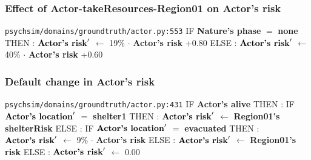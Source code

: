 \documentclass{article}%
\begin{document}
\subsubsection{Effect of Actor{-}takeResources{-}Region01 on Actor's risk}%
\label{ssubsec:Effect of Actor{-}takeResources{-}Region01 on Actor's risk}%
\begin{flushleft}%
\verb|psychsim/domains/groundtruth/actor.py:553|%
\linebreak%
IF %
\textbf{Nature's phase}%
$=$%
\textbf{none}%
\linebreak%
\hspace*{2em}%
THEN %
: %
$\mbox{\textbf{Actor's risk}} '$%
$\leftarrow$%
19\%%
$\cdot$%
\textbf{Actor's risk}%
+0.80%
\linebreak%
\hspace*{2em}%
ELSE %
: %
$\mbox{\textbf{Actor's risk}} '$%
$\leftarrow$%
40\%%
$\cdot$%
\textbf{Actor's risk}%
+0.60%
\end{flushleft}

%
\subsubsection{Default change in Actor's risk}%
\label{ssubsec:Default change in Actor's risk}%
\begin{flushleft}%
\verb|psychsim/domains/groundtruth/actor.py:431|%
\linebreak%
IF %
\textbf{Actor's alive}%
\linebreak%
\hspace*{2em}%
THEN %
: %
IF %
$\mbox{\textbf{Actor's location}} '$%
$=$%
\textbf{shelter1}%
\linebreak%
\hspace*{4em}%
THEN %
: %
$\mbox{\textbf{Actor's risk}} '$%
$\leftarrow$%
\textbf{Region01's shelterRisk}%
\linebreak%
\hspace*{4em}%
ELSE %
: %
IF %
$\mbox{\textbf{Actor's location}} '$%
$=$%
\textbf{evacuated}%
\linebreak%
\hspace*{6em}%
THEN %
: %
$\mbox{\textbf{Actor's risk}} '$%
$\leftarrow$%
9\%%
$\cdot$%
\textbf{Actor's risk}%
\linebreak%
\hspace*{6em}%
ELSE %
: %
$\mbox{\textbf{Actor's risk}} '$%
$\leftarrow$%
\textbf{Region01's risk}%
\linebreak%
\hspace*{2em}%
ELSE %
: %
$\mbox{\textbf{Actor's risk}} '$%
$\leftarrow$%
0.00%
\end{flushleft}
\end{document}
